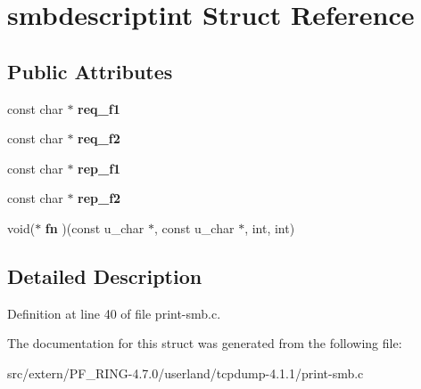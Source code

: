 \hypertarget{structsmbdescriptint}{
\section{smbdescriptint Struct Reference}
\label{structsmbdescriptint}
}
\subsection*{Public Attributes}
\begin{DoxyCompactItemize}
\item 
\hypertarget{structsmbdescriptint_a146c0c0d544316fa6b1f820867a1f18b}{
const char $\ast$ {\bfseries req\_\-f1}}
\label{structsmbdescriptint_a146c0c0d544316fa6b1f820867a1f18b}

\item 
\hypertarget{structsmbdescriptint_a8b6d9f624d30e000614c25936c207704}{
const char $\ast$ {\bfseries req\_\-f2}}
\label{structsmbdescriptint_a8b6d9f624d30e000614c25936c207704}

\item 
\hypertarget{structsmbdescriptint_aae59d5729eb968d0503b6b733d1a534e}{
const char $\ast$ {\bfseries rep\_\-f1}}
\label{structsmbdescriptint_aae59d5729eb968d0503b6b733d1a534e}

\item 
\hypertarget{structsmbdescriptint_aded250abeed09d2279105cb3b253b8f9}{
const char $\ast$ {\bfseries rep\_\-f2}}
\label{structsmbdescriptint_aded250abeed09d2279105cb3b253b8f9}

\item 
\hypertarget{structsmbdescriptint_a50289ad907e25f02b1b984c3ce120eb0}{
void($\ast$ {\bfseries fn} )(const u\_\-char $\ast$, const u\_\-char $\ast$, int, int)}
\label{structsmbdescriptint_a50289ad907e25f02b1b984c3ce120eb0}

\end{DoxyCompactItemize}


\subsection{Detailed Description}


Definition at line 40 of file print-\/smb.c.



The documentation for this struct was generated from the following file:\begin{DoxyCompactItemize}
\item 
src/extern/PF\_\-RING-\/4.7.0/userland/tcpdump-\/4.1.1/print-\/smb.c\end{DoxyCompactItemize}
